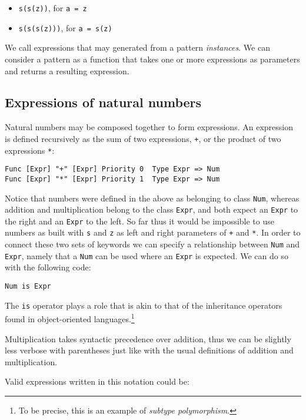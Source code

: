 \begin{itemize}
\item \texttt{s(s(z))}, for \texttt{a = z}
\item \texttt{s(s(s(z)))}, for \texttt{a = s(z)}
\end{itemize}

We call expressions that may generated from a pattern \textit{instances}. We can consider a pattern as a function that takes one or more expressions as parameters and returns a resulting expression.

\subsection{Expressions of natural numbers}
Natural numbers may be composed together to form expressions. An expression is defined recursively as the sum of two expressions, \texttt{+}, or the product of two expressions \texttt{*}:

\begin{lstlisting}
Func [Expr] "+" [Expr] Priority 0  Type Expr => Num
Func [Expr] "*" [Expr] Priority 1  Type Expr => Num
\end{lstlisting}

Notice that numbers were defined in the above as belonging to class \texttt{Num}, whereas addition and multiplication belong to the class \texttt{Expr}, and both expect an \texttt{Expr} to the right and an \texttt{Expr} to the left. So far thus it would be impossible to use numbers as built with \texttt{s} and \texttt{z} as left and right parameters of \texttt{+} and \texttt{*}. In order to connect these two sets of keywords we can specify a relationship between \texttt{Num} and \texttt{Expr}, namely that a \texttt{Num} can be used where an \texttt{Expr} is expected. We can do so with the following code:

\begin{lstlisting}
Num is Expr
\end{lstlisting}

The \texttt{is} operator plays a role that is akin to that of the inheritance operators found in object-oriented languages.\footnote{To be precise, this is an example of \textit{subtype polymorphism}.}

Multiplication takes syntactic precedence over addition, thus we can be slightly less verbose with parentheses just like with the usual definitions of addition and multiplication.

Valid expressions written in this notation could be:

